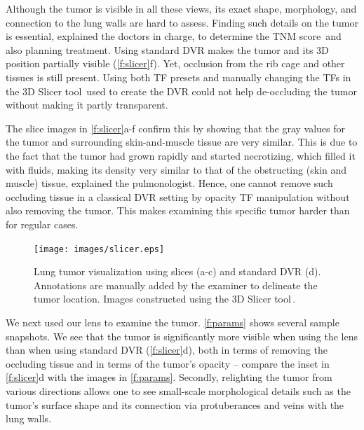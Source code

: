  Although the tumor is visible in all these views, its exact shape, morphology, and connection to the lung walls are hard to assess. Finding such details on the tumor is essential, explained the doctors in charge, to determine the TNM score\,\cite{brierley} and also planning treatment. Using standard DVR makes the tumor and its 3D position partially visible (\autoref{f:slicer}f). Yet, occlusion from the rib cage and other tissues is still present. Using both TF presets and manually changing the TFs in the 3D Slicer tool\,\cite{slicer} used to create the DVR could not help de-occluding the tumor without making it partly transparent.
 
  The slice images in \autoref{f:slicer}a-f confirm this by showing that the gray values for the tumor and surrounding skin-and-muscle tissue are very similar. This is due to the fact that the tumor had grown rapidly and started necrotizing, which filled it with fluids, making its density very similar to that of the obstructing (skin and muscle) tissue, explained the pulmonologist. Hence, one cannot remove such occluding tissue in a classical DVR setting by opacity TF manipulation without also removing the tumor. This makes examining this specific tumor harder than for regular cases.

\begin{figure}
\centering
\texttt{[image: images/slicer.eps]}
\caption{Lung tumor visualization using slices (a-c) and standard DVR (d). Annotations are manually added by the examiner to delineate the tumor location. Images constructed using the 3D Slicer tool\,\cite{slicer}.}
\label{f:slicer}
\end{figure}

We next used our lens to examine the tumor. \autoref{f:params} shows several sample snapshots. We see that the tumor is significantly more visible when using the lens than when using standard DVR (\autoref{f:slicer}d), both in terms of removing the occluding tissue and in terms of the tumor's opacity -- compare the inset in \autoref{f:slicer}d with the images in \autoref{f:params}. Secondly, relighting the tumor from various directions allows one to see small-scale morphological details such as the tumor's surface shape and its connection via protuberances and veins with the lung walls.

